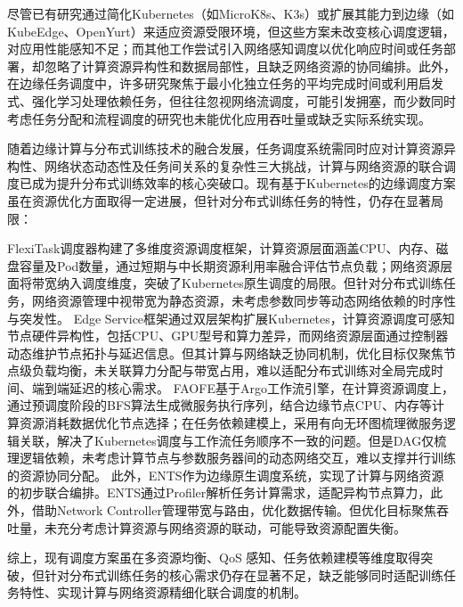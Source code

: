 尽管已有研究通过简化Kubernetes（如MicroK8s、K3s\cite{Kjorveziroski2022}）或扩展其能力到边缘（如KubeEdge、OpenYurt\cite{10456315}）来适应资源受限环境，但这些方案未改变核心调度逻辑，对应用性能感知不足；而其他工作\cite{8806671,ROSSI2020161,9488670}尝试引入网络感知调度以优化响应时间或任务部署，却忽略了计算资源异构性和数据局部性，且缺乏网络资源的协同编排。此外，在边缘任务调度中，许多研究\cite{8486305,9627763}聚焦于最小化独立任务的平均完成时间或利用启发式、强化学习处理依赖任务，但往往忽视网络流调度，可能引发拥塞，而少数同时考虑任务分配和流程调度的研究\cite{8576600,9996361,9709117}也未能优化应用吞吐量或缺乏实际系统实现。

随着边缘计算与分布式训练技术的融合发展，任务调度系统需同时应对计算资源异构性、网络状态动态性及任务间关系的复杂性三大挑战，计算与网络资源的联合调度已成为提升分布式训练效率的核心突破口。现有基于Kubernetes的边缘调度方案虽在资源优化方面取得一定进展，但针对分布式训练任务的特性，仍存在显著局限：

FlexiTask\cite{FlexiTask}调度器构建了多维度资源调度框架，计算资源层面涵盖CPU、内存、磁盘容量及Pod数量，通过短期与中长期资源利用率融合评估节点负载；网络资源层面将带宽纳入调度维度，突破了Kubernetes原生调度的局限。但针对分布式训练任务，网络资源管理中视带宽为静态资源，未考虑参数同步等动态网络依赖的时序性与突发性。
Edge Service\cite{EdgeService}框架通过双层架构扩展Kubernetes，计算资源调度可感知节点硬件异构性，包括CPU、GPU型号和算力差异，而网络资源层面通过控制器动态维护节点拓扑与延迟信息。但其计算与网络缺乏协同机制，优化目标仅聚焦节点级负载均衡，未关联算力分配与带宽占用，难以适配分布式训练对全局完成时间、端到端延迟的核心需求。
FAOFE\cite{FAOFE}基于Argo工作流引擎，在计算资源调度上，通过预调度阶段的BFS算法生成微服务执行序列，结合边缘节点CPU、内存等计算资源消耗数据优化节点选择；在任务依赖建模上，采用有向无环图梳理微服务逻辑关联，解决了Kubernetes调度与工作流任务顺序不一致的问题。但是DAG仅梳理逻辑依赖，未考虑计算节点与参数服务器间的动态网络交互，难以支撑并行训练的资源协同分配。
此外，ENTS\cite{ENTS}作为边缘原生调度系统，实现了计算与网络资源的初步联合编排。ENTS通过Profiler解析任务计算需求，适配异构节点算力，此外，借助Network Controller管理带宽与路由，优化数据传输。但优化目标聚焦吞吐量，未充分考虑计算资源与网络资源的联动，可能导致资源配置失衡。

综上，现有调度方案虽在多资源均衡、QoS 感知、任务依赖建模等维度取得突破，但针对分布式训练任务的核心需求仍存在显著不足，缺乏能够同时适配训练任务特性、实现计算与网络资源精细化联合调度的机制。

